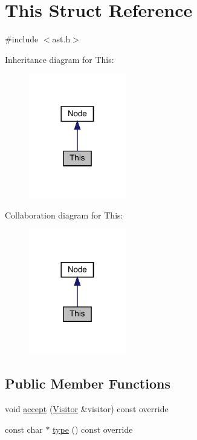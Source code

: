 \hypertarget{struct_this}{}\section{This Struct Reference}
\label{struct_this}


{\ttfamily \#include $<$ast.\+h$>$}



Inheritance diagram for This\+:
\nopagebreak
\begin{figure}[H]
\begin{center}
\leavevmode
\includegraphics[width=120pt]{struct_this__inherit__graph}
\end{center}
\end{figure}


Collaboration diagram for This\+:
\nopagebreak
\begin{figure}[H]
\begin{center}
\leavevmode
\includegraphics[width=120pt]{struct_this__coll__graph}
\end{center}
\end{figure}
\subsection*{Public Member Functions}
\begin{DoxyCompactItemize}
\item 
void \hyperlink{struct_this_a9ff113a898e7756ce6854c8167dddb15}{accept} (\hyperlink{struct_visitor}{Visitor} \&visitor) const override
\item 
const char $\ast$ \hyperlink{struct_this_a124796ed69ea21377e84a4538c304b3a}{type} () const override
\end{DoxyCompactItemize}


